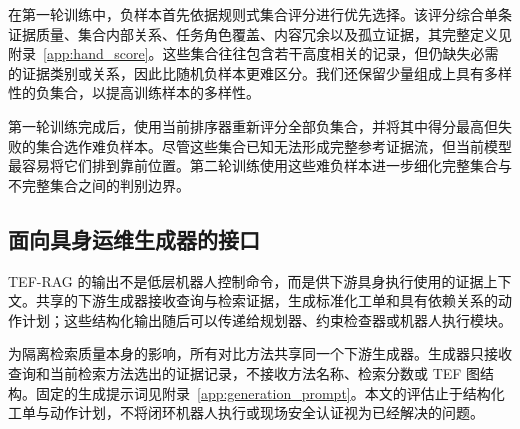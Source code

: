 在第一轮训练中，负样本首先依据规则式集合评分进行优先选择。该评分综合单条证据质量、集合内部关系、任务角色覆盖、内容冗余以及孤立证据，其完整定义见附录~\ref{app:hand_score}。这些集合往往包含若干高度相关的记录，但仍缺失必需的证据类别或关系，因此比随机负样本更难区分。我们还保留少量组成上具有多样性的负集合，以提高训练样本的多样性。

第一轮训练完成后，使用当前排序器重新评分全部负集合，并将其中得分最高但失败的集合选作难负样本。尽管这些集合已知无法形成完整参考证据流，但当前模型最容易将它们排到靠前位置。第二轮训练使用这些难负样本进一步细化完整集合与不完整集合之间的判别边界。

\subsection{面向具身运维生成器的接口}

TEF-RAG 的输出不是低层机器人控制命令，而是供下游具身执行使用的证据上下文。共享的下游生成器接收查询与检索证据，生成标准化工单和具有依赖关系的动作计划；这些结构化输出随后可以传递给规划器、约束检查器或机器人执行模块。

为隔离检索质量本身的影响，所有对比方法共享同一个下游生成器。生成器只接收查询和当前检索方法选出的证据记录，不接收方法名称、检索分数或 TEF 图结构。固定的生成提示词见附录~\ref{app:generation_prompt}。本文的评估止于结构化工单与动作计划，不将闭环机器人执行或现场安全认证视为已经解决的问题。
